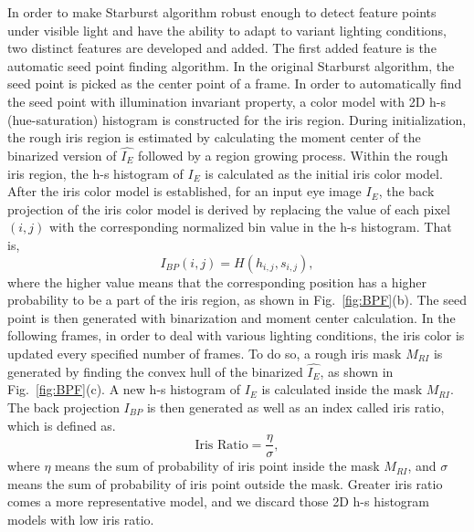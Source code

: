\documentclass[sigconf]{acmart}
\begin{document}
In order to make Starburst algorithm robust enough to detect feature points under visible light
and have the ability to adapt to variant lighting conditions, two distinct features are developed and added.
The first added feature is the automatic seed point finding algorithm.
In the original Starburst algorithm, the seed point is picked as the center point of a frame.
In order to automatically find the seed point with illumination invariant property,
a color model with 2D h-s (hue-saturation) histogram is constructed for the iris region.
During initialization, the rough iris region is estimated by calculating the moment center of the binarized version of $\hat{I_E}$
followed by a region growing process.
Within the rough iris region, the h-s histogram of $I_E$ is calculated as the initial iris color model.
After the iris color model is established, for an input eye image $I_E$, the back projection of the iris color model is derived by replacing the value of each pixel $(i,j)$ with the corresponding normalized bin value in the h-s histogram. That is,
\begin{equation}
I_{BP}(i,j) = H(h_{i,j}, s_{i,j}),
\end{equation}
where the higher value means that the corresponding position has a higher probability to be a part of the iris region, as shown in Fig.~\ref{fig:BPF}(b).
The seed point is then generated with binarization and moment center calculation.
In the following frames, in order to deal with various lighting conditions, the iris color is updated every specified number of frames.
To do so, a rough iris mask $M_{RI}$ is generated by finding the convex hull of the binarized $\hat{I_E}$, as shown in Fig.~\ref{fig:BPF}(c).
A new h-s histogram of $I_E$ is calculated inside the mask $M_{RI}$.
The back projection $I_{BP}$ is then generated as well as an index called iris ratio, which is defined as.
 \begin{equation}
\mbox{Iris Ratio} = \frac{\eta}{\sigma},
\end{equation}
where $\eta$ means the sum of probability of iris point inside the mask $M_{RI}$,
and $\sigma$ means the sum of probability of iris point outside the mask.
Greater iris ratio comes a more representative model,
and we discard those 2D h-s histogram models with low iris ratio.
\end{document}
